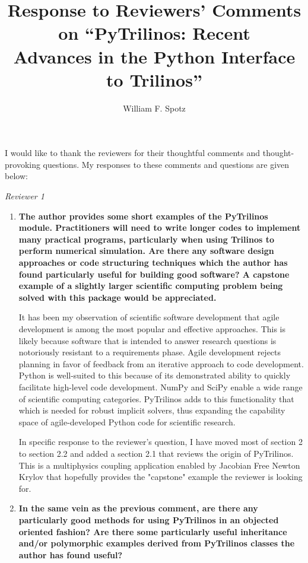 \documentclass[11pt]{article}
\title{Response to Reviewers' Comments on ``PyTrilinos: Recent \\
  Advances in the Python Interface to Trilinos''}
\author{William F. Spotz}
\newif\ifpdf
\begin{document}
\ifpdf
\DeclareGraphicsExtensions{.pdf, .jpg, .tif}
\else
{}
\fi

\maketitle

I would like to thank the reviewers for their thoughtful comments and  thought-provoking questions.  My responses to these comments and questions are given below:

{\em Reviewer 1}

\begin{enumerate}

\item {\bf The author provides some short examples of the PyTrilinos module. Practitioners will need to write longer codes to implement many practical programs, particularly when using Trilinos to perform numerical simulation. Are there any software design approaches or code structuring techniques which the author has found particularly useful for building good software? A capstone example of a slightly larger scientific computing problem being solved with this package would be appreciated.}

It has been my observation of scientific software development that agile development is among the most popular and effective approaches.  This is likely because software that is intended to answer research questions is notoriously resistant to a requirements phase.  Agile development rejects planning in favor of feedback from an iterative approach to code development.  Python is well-suited to this because of its demonstrated ability to quickly facilitate high-level code development.  NumPy and SciPy enable a wide range of scientific computing categories.  PyTrilinos adds to this functionality that which is needed for robust implicit solvers, thus expanding the capability space of agile-developed Python code for scientific research.

In specific response to the reviewer's question, I have moved most of section 2 to section 2.2 and added a section 2.1 that reviews the origin of PyTrilinos.  This is a multiphysics coupling application enabled by Jacobian Free Newton Krylov that hopefully provides the "capstone" example the reviewer is looking for.

\item {\bf In the same vein as the previous comment, are there any particularly good methods for using PyTrilinos in an objected oriented fashion? Are there some particularly useful inheritance and/or polymorphic examples derived from PyTrilinos classes the author has found useful?}


\end{enumerate}
\end{document}

